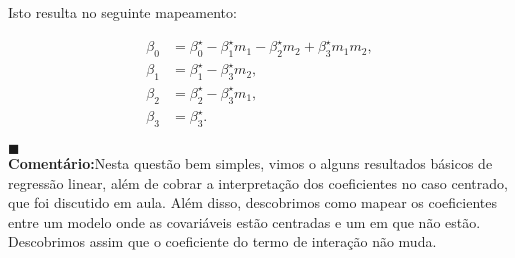 {Isto resulta no seguinte mapeamento:

\begin{align*}
    \beta_0 &= \beta^{\star}_0 - \beta^{\star}_1 m_1 - \beta^{\star}_2 m_2 + \beta^{\star}_3 m_1 m_2, \\
    \beta_1 &= \beta^{\star}_1 - \beta^{\star}_3 m_2, \\
    \beta_2 &= \beta^{\star}_2 - \beta^{\star}_3 m_1, \\
    \beta_3 &= \beta^{\star}_3.
\end{align*}

$\blacksquare$\\
\textbf{Comentário:}Nesta questão bem simples, vimos o alguns resultados básicos de regressão linear, além de cobrar a interpretação dos coeficientes no caso centrado, que foi discutido em aula. 
Além disso, descobrimos como mapear os coeficientes entre um modelo onde as covariáveis estão centradas e um em que não estão.
Descobrimos assim que o coeficiente do termo de interação não muda.} 